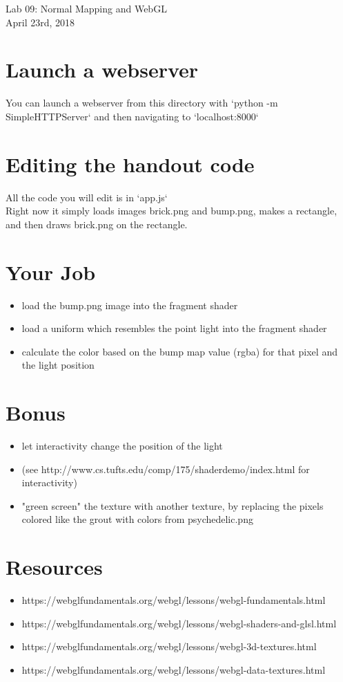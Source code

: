 \documentclass{article}
\begin{document}
\begin{centering}
Lab 09: Normal Mapping and WebGL\\
April 23rd, 2018\\

\section{Launch a webserver}
You can launch a webserver from this directory with `python -m SimpleHTTPServer` and then navigating to `localhost:8000`\\
\section{Editing the handout code}
All the code you will edit is in `app.js`\\
Right now it simply loads images brick.png and bump.png, makes a rectangle, and then draws brick.png on the rectangle.\\
\section{Your Job}
\begin{itemize}
\item load the bump.png image into the fragment shader
\item load a uniform which resembles the point light into the fragment shader
\item calculate the color based on the bump map value (rgba) for that pixel and the light position
\end{itemize}
\section{Bonus}
\begin{itemize}
  \item let interactivity change the position of the light
  \item (see http://www.cs.tufts.edu/comp/175/shaderdemo/index.html for interactivity)
  \item "green screen" the texture with another texture, by replacing the pixels colored like the grout with colors from psychedelic.png
\end{itemize}
\section{Resources}
\begin{itemize}
  \item https://webglfundamentals.org/webgl/lessons/webgl-fundamentals.html
  \item https://webglfundamentals.org/webgl/lessons/webgl-shaders-and-glsl.html
  \item https://webglfundamentals.org/webgl/lessons/webgl-3d-textures.html
  \item https://webglfundamentals.org/webgl/lessons/webgl-data-textures.html
\end{itemize}
\end{centering}
\end{document}
